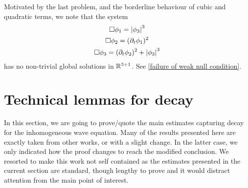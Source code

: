 \documentclass[11pt, oneside]{amsart}
\begin{document}
	Motivated by the last problem, and the borderline behaviour of cubic and quadratic terms, we note that the system
	\begin{equation}\label{critical problem}
		\begin{gathered}
			\Box\phi_1=\left\lvert \phi_3\right\rvert^3\\
			\Box\phi_2=(\partial_t\phi_1)^2\\
			\Box\phi_3=(\partial_t\phi_2)^2+\left\lvert \phi_3\right\rvert^3
		\end{gathered}
	\end{equation}	
	has no non-trivial global solutions in $\mathbb{R}^{3+1}$. See \cref{failure of weak null condition}.
	
	\section{Technical lemmas for decay}
	In this section, we are going to prove/quote the main estimates capturing decay for the inhomogeneous wave equation. Many of the results presented here are exactly taken from other works, or with a slight change. In the latter case, we only indicated how the proof changes to reach the modified conclusion. We resorted to make this work not self contained as the estimates presented in the current section are standard, though lengthy to prove and it would distract attention from the main point of interest.
	
	
\end{document}
